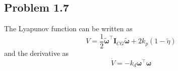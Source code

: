 \subsection{Problem 1.7}
The Lyapunov function can be written as
 \begin{equation}
	 V = \frac{1}{2} \tilde{\boldsymbol{\omega}}^{\top} \mathbf{I}_{CG}\tilde{\boldsymbol{\omega}} + 2 k_p (1-\tilde{\eta})
 \end{equation}
and the derivative as
\begin{equation}
	\dot{V} = -k_d \boldsymbol{\omega}^{\top} \boldsymbol{\omega}
\end{equation}

